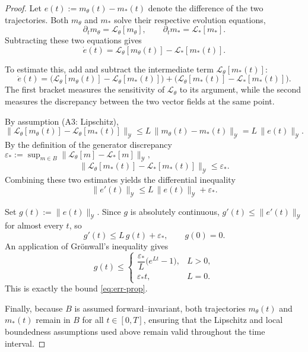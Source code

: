 \documentclass[11pt,a4paper]{article}
\theoremstyle{plain}
\theoremstyle{definition}
\theoremstyle{remark}
\begin{document}
\begin{proof}
	Let $e(t):=m_\theta(t)-m_*(t)$ denote the difference of the two trajectories.
	Both $m_\theta$ and $m_*$ solve their respective evolution equations,
	\[
		\partial_t m_\theta = \mathcal L_\theta[m_\theta],
		\qquad
		\partial_t m_*      = \mathcal L_*[m_*].
	\]
	Subtracting these two equations gives
	\[
		\dot e(t)
		= \mathcal L_\theta[m_\theta(t)]-\mathcal L_*[m_*(t)] .
	\]

	\medskip\noindent
	To estimate this, add and subtract the intermediate term
	$\mathcal L_\theta[m_*(t)]$:
	\[
		\dot e(t)
		= \bigl(\mathcal L_\theta[m_\theta(t)]
		-\mathcal L_\theta[m_*(t)]\bigr)
		+\bigl(\mathcal L_\theta[m_*(t)]
		-\mathcal L_*[m_*(t)]\bigr).
	\]
	The first bracket measures the sensitivity of $\mathcal L_\theta$
	to its argument, while the second measures the discrepancy
	between the two vector fields at the same point.

	\medskip\noindent
	By assumption \textnormal{(A3: Lipschitz)},
	\[
		\bigl\|\mathcal L_\theta[m_\theta(t)]
		-\mathcal L_\theta[m_*(t)]\bigr\|_{\mathcal Y}
		\le L\,\|m_\theta(t)-m_*(t)\|_{\mathcal Y}
		= L\,\|e(t)\|_{\mathcal Y}.
	\]
	By the definition of the generator discrepancy
	\(
	\varepsilon_*:=\sup_{m\in B}
	\|\mathcal L_\theta[m]-\mathcal L_*[m]\|_{\mathcal Y},
	\)
	\[
		\bigl\|\mathcal L_\theta[m_*(t)]
		-\mathcal L_*[m_*(t)]\bigr\|_{\mathcal Y}
		\le \varepsilon_*.
	\]
	Combining these two estimates yields the differential inequality
	\[
		\|e'(t)\|_{\mathcal Y}
		\le L\,\|e(t)\|_{\mathcal Y}+\varepsilon_*.
	\]

	\medskip\noindent
	Set $g(t):=\|e(t)\|_{\mathcal Y}$.  Since $g$ is absolutely continuous,
	$g'(t)\le \|e'(t)\|_{\mathcal Y}$ for almost every $t$, so
	\[
		g'(t) \le L\,g(t) + \varepsilon_*,
		\qquad g(0)=0.
	\]
	An application of Grönwall’s inequality gives
	\[
		g(t)\le
		\begin{cases}
			\dfrac{\varepsilon_*}{L}\bigl(e^{L t}-1\bigr), & L>0, \\[1ex]
			\varepsilon_* t,                               & L=0.
		\end{cases}
	\]
	This is exactly the bound \eqref{eq:err-prop}.

	\medskip\noindent
	Finally, because $B$ is assumed forward–invariant,
	both trajectories $m_\theta(t)$ and $m_*(t)$ remain in $B$
	for all $t\in[0,T]$, ensuring that the Lipschitz and local boundedness
	assumptions used above remain valid throughout the time interval.
\end{proof}
\end{document}
